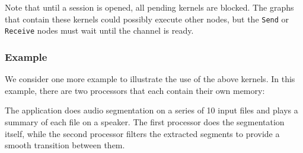 Note that until a session is opened, all pending kernels are blocked.
The graphs that contain these kernels could possibly execute other
nodes, but the {\tt Send} or {\tt Receive} nodes must wait until the
channel is ready.

\subsubsection*{Example}

We consider one more example to illustrate the use of the above
kernels.  In this example, there are two processors that each contain
their own memory:

\begin{figure}[h]
\begin{center}
\end{center}
\vspace{-12pt}
\end{figure}

The application does audio segmentation on a series of 10 input files
and plays a summary of each file on a speaker.  The first processor
does the segmentation itself, while the second processor filters the
extracted segments to provide a smooth transition between them.

